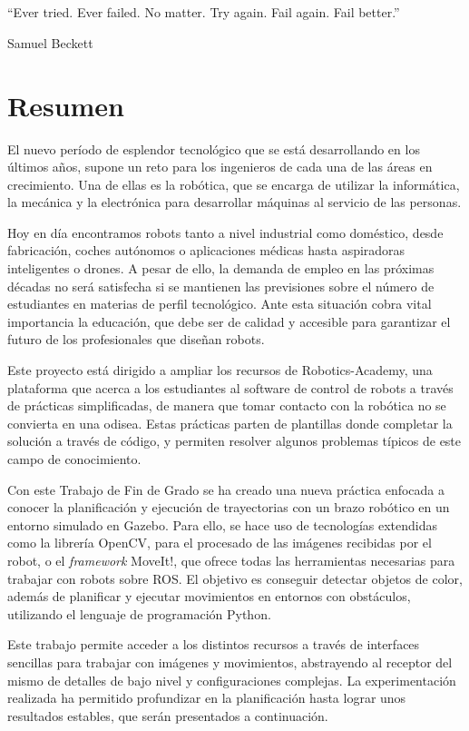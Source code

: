 \documentclass[12pt,spanish,chapterprefix, numbers=noenddot]{book}
\numberwithin{equation}{section}
\numberwithin{figure}{section}
\begin{document}
\chapter*{}
\epigraph{“Ever tried. Ever failed. No matter. Try again. Fail again. Fail better.”}{Samuel Beckett}


\chapter*{Resumen}
El nuevo período de esplendor tecnológico que se está desarrollando en los últimos años, supone un reto para los ingenieros de cada una de las áreas en crecimiento. Una de ellas es la robótica, que se encarga de utilizar la informática, la mecánica y la electrónica para desarrollar máquinas al servicio de las personas. 

Hoy en día encontramos robots tanto a nivel industrial como doméstico, desde fabricación, coches autónomos o aplicaciones médicas hasta aspiradoras inteligentes o drones. A pesar de ello, la demanda de empleo en las próximas décadas no será satisfecha si se mantienen las previsiones sobre el número de estudiantes en materias de perfil tecnológico. Ante esta situación cobra vital importancia la educación, que debe ser de calidad y accesible para garantizar el futuro de los profesionales que diseñan robots. 

Este proyecto está dirigido a ampliar los recursos de Robotics-Academy, una plataforma que acerca a los estudiantes al software de control de robots a través de prácticas simplificadas, de manera que tomar contacto con la robótica no se convierta en una odisea. Estas prácticas parten de plantillas donde completar la solución a través de código, y permiten resolver algunos problemas típicos de este campo de conocimiento. 

Con este Trabajo de Fin de Grado se ha creado una nueva práctica enfocada a conocer la planificación y ejecución de trayectorias con un brazo robótico en un entorno simulado en Gazebo. Para ello, se hace uso de tecnologías extendidas como la librería OpenCV, para el procesado de las imágenes recibidas por el robot, o el \textit{framework} MoveIt!, que ofrece todas las herramientas necesarias para trabajar con robots sobre ROS. El objetivo es conseguir detectar objetos de color, además de planificar y ejecutar movimientos en entornos con obstáculos, utilizando el lenguaje de programación Python. 

Este trabajo permite acceder a los distintos recursos a través de interfaces sencillas para trabajar con imágenes y movimientos, abstrayendo al receptor del mismo de detalles de bajo nivel y configuraciones complejas. La experimentación realizada ha permitido profundizar en la planificación hasta lograr unos resultados estables, que serán presentados a continuación.  
\end{document}
